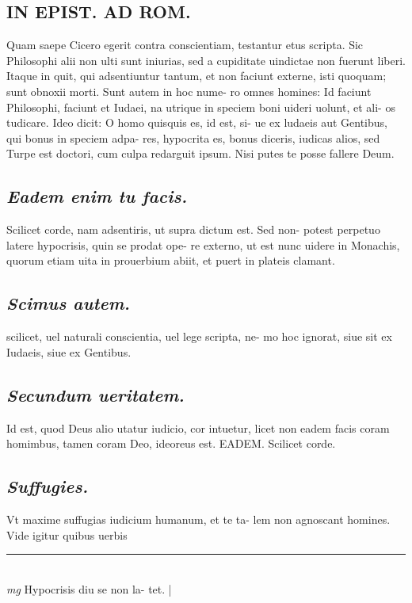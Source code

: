 \documentclass{article}
\begin{document}
\begin{pages}
\section*{ IN EPIST. AD ROM.  }
\marginpar{[ p.]}\pstart Quam saepe Cicero egerit contra conscientiam, testantur etus scripta. Sic Philosophi alii non ulti sunt iniurias, sed a cupiditate uindictae non fuerunt liberi. Itaque in quit, qui adsentiuntur tantum, et non faciunt externe, isti quoquam; sunt obnoxii morti. Sunt autem in hoc nume- ro omnes homines: Id faciunt Philosophi, faciunt et Iudaei, na utrique in speciem boni uideri uolunt, et ali- os tudicare. Ideo dicit: O homo quisquis es, id est, si- ue ex ludaeis aut Gentibus, qui bonus in speciem adpa- res, hypocrita es, bonus diceris, iudicas alios, sed Turpe est doctori, cum culpa redarguit ipsum. Nisi putes te posse fallere Deum.   \pend
{}
{}
\subsection*{\textit{Eadem enim tu facis. }}\pstart Scilicet corde, nam adsentiris, ut supra dictum est. Sed non- potest perpetuo latere hypocrisis, quin se prodat ope- re externo, ut est nunc uidere in Monachis, quorum etiam uita in prouerbium abiit, et puert in plateis clamant.   \pend
{}
{}
\subsection*{\textit{Scimus autem. }}\pstart scilicet, uel naturali conscientia, uel lege scripta, ne- mo hoc ignorat, siue sit ex Iudaeis, siue ex Gentibus.   \pend
{}
{}
\subsection*{\textit{Secundum ueritatem. }}\pstart Id est, quod Deus alio utatur iudicio, cor intuetur, licet non eadem facis coram homimbus, tamen coram Deo, ideoreus est. EADEM. Scilicet corde.   \pend
{}
{}
\subsection*{\textit{Suffugies. }}\pstart Vt maxime suffugias iudicium humanum, et te ta- lem non agnoscant homines. Vide igitur quibus uerbis  \pend
\vspace{0.5cm}\noindent
\vspace{0.2cm}\rule{1cm}{0.2pt}\\ 
\hspace{0.2cm}\textit{mg}
\footnotesize Hypocrisis diu se non la- tet. 
\normalsize| 

\end{pages}
\end{document}
